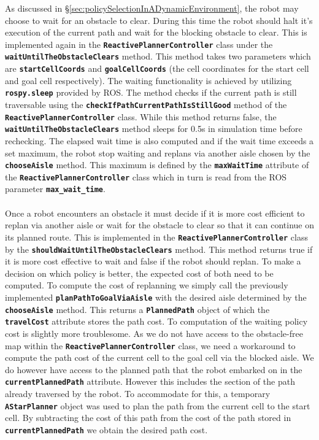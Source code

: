 \documentclass[a4paper,12pt]{article}
\begin{document}
			As discussed in \S \ref{sec:policySelectionInADynamicEnvironment}, the robot may choose to wait for an obstacle to clear. During this time the robot should halt it's execution of the current path and wait for the blocking obstacle to clear. This is implemented again in the \textbf{\texttt{ReactivePlannerController}} class under the \textbf{\texttt{waitUntilTheObstacleClears}} method. This method takes two parameters which are \textbf{\texttt{startCellCoords}} and \textbf{\texttt{goalCellCoords}} (the cell coordinates for the start cell and goal cell respectively). The waiting functionality is achieved by utilizing \textbf{\texttt{rospy.sleep}} provided by ROS. The method checks if the current path is still traversable using the \textbf{\texttt{checkIfPathCurrentPathIsStillGood}} method of the \textbf{\texttt{ReactivePlannerController}} class. While this method returns false, the \textbf{\texttt{waitUntilTheObstacleClears}} method sleeps for 0.5s in simulation time before rechecking. The elapsed wait time is also computed and if the wait time exceeds a set maximum, the robot stop waiting and replans via another aisle chosen by the \textbf{\texttt{chooseAisle}} method. This maximum is defined by the \textbf{\texttt{maxWaitTime}} attribute of the \textbf{\texttt{ReactivePlannerController}} class which in turn is read from the ROS parameter \textbf{\texttt{max\_wait\_time}}.
			\\
			\\
			Once a robot encounters an obstacle it must decide if it is more cost efficient to replan via another aisle or wait for the obstacle to clear so that it can continue on its planned route. This is implemented in the \textbf{\texttt{ReactivePlannerController}} class by the \textbf{\texttt{shouldWaitUntilTheObstacleClears}} method. This method returns true if it is more cost effective to wait and false if the robot should replan. To make a decision on which policy is better, the expected cost of both need to be computed. To compute the cost of replanning we simply call the previously implemented \textbf{\texttt{planPathToGoalViaAisle}} with the desired aisle determined by the \textbf{\texttt{chooseAisle}} method. This returns a \textbf{\texttt{PlannedPath}} object of which the \textbf{\texttt{travelCost}} attribute stores the path cost. To computation of the waiting policy cost is slightly more troublesome. As we do not have access to the obstacle-free map within the \textbf{\texttt{ReactivePlannerController}} class, we need a workaround to compute the path cost of the current cell to the goal cell via the blocked aisle. We do however have access to the planned path that the robot embarked on in the \textbf{\texttt{currentPlannedPath}} attribute. However this includes the section of the path already traversed by the robot. To accommodate for this, a temporary \textbf{\texttt{AStarPlanner}} object was used to plan the path from the current cell to the start cell. By subtracting the cost of this path from the cost of the path stored in \textbf{\texttt{currentPlannedPath}} we obtain the desired path cost.
\end{document}
